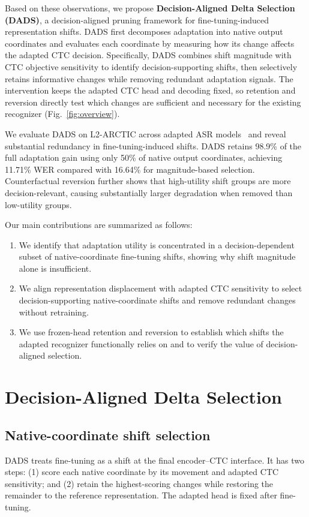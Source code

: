 \documentclass{article}
\begin{document}
Based on these observations, we propose \textbf{Decision-Aligned Delta Selection (DADS)}, a decision-aligned pruning framework for fine-tuning-induced representation shifts. DADS first decomposes adaptation into native output coordinates and evaluates each coordinate by measuring how its change affects the adapted CTC decision. Specifically, DADS combines shift magnitude with CTC objective sensitivity to identify decision-supporting shifts, then selectively retains informative changes while removing redundant adaptation signals. The intervention keeps the adapted CTC head and decoding fixed, so retention and reversion directly test which changes are sufficient and necessary for the existing recognizer (Fig.~\ref{fig:overview}).

We evaluate DADS on L2-ARCTIC across adapted ASR models~\cite{zhao2018l2arctic} and reveal substantial redundancy in fine-tuning-induced shifts. DADS retains 98.9\% of the full adaptation gain using only 50\% of native output coordinates, achieving 11.71\% WER compared with 16.64\% for magnitude-based selection. Counterfactual reversion further shows that high-utility shift groups are more decision-relevant, causing substantially larger degradation when removed than low-utility groups.

Our main contributions are summarized as follows:
\begin{enumerate}
\setlength{\itemsep}{2pt}
\setlength{\parsep}{0pt}
\item We identify that adaptation utility is concentrated in a decision-dependent subset of native-coordinate fine-tuning shifts, showing why shift magnitude alone is insufficient.
\item We align representation displacement with adapted CTC sensitivity to select decision-supporting native-coordinate shifts and remove redundant changes without retraining.
\item We use frozen-head retention and reversion to establish which shifts the adapted recognizer functionally relies on and to verify the value of decision-aligned selection.
\end{enumerate}



\section{Decision-Aligned Delta Selection}
\label{sec:method}

\subsection{Native-coordinate shift selection}
\label{sec:native_frame}
DADS treats fine-tuning as a shift at the final encoder--CTC interface. It has two steps: (1) score each native coordinate by its movement and adapted CTC sensitivity; and (2) retain the highest-scoring changes while restoring the remainder to the reference representation. The adapted head is fixed after fine-tuning.
\end{document}
